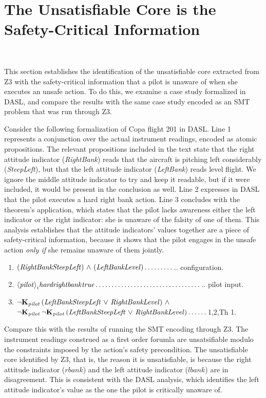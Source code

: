 \section{The Unsatisfiable Core is the Safety-Critical Information}~\label{safetycritical}

This section establishes the identification of the unsatisfiable core extracted from Z3 with the safety-critical information that a pilot is unaware of when she executes an unsafe action. To do this, we examine a case study formalized in DASL, and compare the results with the same case study encoded as an SMT problem that was run through Z3.

Consider the following formalization of Copa flight 201 in DASL. Line 1 represents a conjunction over the actual instrument readings, encoded as atomic propositions. The relevant propositions included in the text state that the right attitude indicator (\emph{RightBank}) reads that the aircraft is pitching left considerably (\emph{SteepLeft}), but that the left attitude indicator (\emph{LeftBank}) reads level flight. We ignore the middle attitude indicator to try and keep it readable, but if it were included, it would be present in the conclusion as well. Line 2 expresses in DASL that the pilot executes a hard right bank action. Line 3 concludes with the theorem's application, which states that the pilot lacks awareness either the left indicator or the right indicator: she is unaware of the falsity of one of them. This analysis establishes that the attitude indicators' values together are a piece of safety-critical information, because it shows that the pilot engages in the unsafe action \emph{only if} she remains unaware of them jointly.

\begin{tcolorbox}	
	\begin{enumerate}
		\item $\mathit{(Right Bank SteepLeft)} {\ \wedge \ } \mathit{(Left Bank Level)} \dots\dots\dots$.. configuration.
		\item $\mathbf{\langle\mathit{pilot}\rangle}_i{\mathit{hardrightbank}}\mathit{true} \dots\dots\dots\dots\dots\dots\dots\dots\dots\dots\dots$.. pilot input.
		\item ${\neg} \mathbf{K}_{\mathbf{\mathit{pilot}}}\,(\mathit{Left Bank SteepLeft} {\ \vee \ } \mathit{Right Bank Level}) {\ \wedge \ }$ ${\neg} \mathbf{K}_{\mathbf{\mathit{pilot}}}\, {\neg} \mathbf{K}_{\mathbf{\mathit{pilot}}}\,(\mathit{Left Bank SteepLeft} {\ \vee \ } \mathit{Right Bank Level}) \dots\dots$1,2,Th 1. 
	\end{enumerate}
\end{tcolorbox}	
Compare this with the results of running the SMT encoding through Z3. The instrument readings construed as a first order forumla are unsatsifiable modulo the constraints imposed by the action's safety precondition. The unsatisfiable core identified by Z3, that is, the reason it is unsatisfiable, is because the right attitude indicator ($rbank$) and the left attitude indicator ($lbank$) are in disagreement. This is consistent with the DASL analysis, which identifies the left attitude indicator's value as the one the pilot is critically unaware of.

